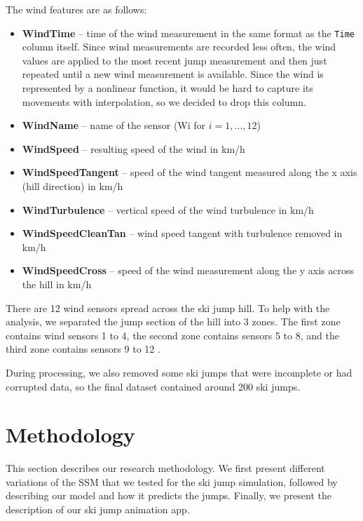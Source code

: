 \documentclass[sigconf]{acmart}
\begin{document}
The wind features are as follows:
\begin{itemize}
\item \textbf{WindTime} -- time of the wind measurement in the same format as
the \texttt{Time} column itself. Since wind measurements are recorded less
often, the wind values are applied to the most recent jump measurement and then
just repeated until a new wind measurement is available. Since the wind is
represented by a nonlinear function, it would be hard to capture its movements
with interpolation, so we decided to drop this column.
\item \textbf{WindName} -- name of the sensor (Wi for $i = 1, \ldots, 12$)
\item \textbf{WindSpeed} -- resulting speed of the wind in km/h
\item \textbf{WindSpeedTangent} -- speed of the wind tangent measured along the
x axis (hill direction) in km/h
\item \textbf{WindTurbulence} -- vertical speed of the wind turbulence in km/h
\item \textbf{WindSpeedCleanTan} -- wind speed tangent with turbulence removed
in km/h
\item \textbf{WindSpeedCross} -- speed of the wind measurement along the y axis
across the hill in km/h
\end{itemize}

There are 12 wind sensors spread across the ski jump hill. To help with the
analysis, we separated the jump section of the hill into 3 zones. The first
zone contains wind sensors 1 to 4, the second zone contains sensors 5 to 8, and
the third zone contains sensors 9 to 12 \cite{thompson2025}.

During processing, we also removed some ski jumps that were incomplete or had
corrupted data, so the final dataset contained around 200 ski jumps.

\section{Methodology}
This section describes our research methodology. We first present different
variations of the SSM that we tested for the ski jump simulation, followed by
describing our model and how it predicts the jumps. Finally, we present the
description of our ski jump animation app.
\end{document}
